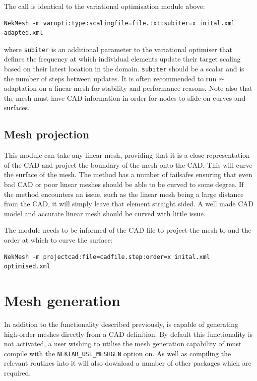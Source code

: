 The call is identical to the variational optimisation module above:
\begin{lstlisting}[style=BashInputStyle]
  NekMesh -m varopti:type:scalingfile=file.txt:subiter=x inital.xml adapted.xml
\end{lstlisting}
where \texttt{subiter} is an additional parameter to the variational
optimiser that defines the frequency at which individual elements
update their target scaling based on their latest location in the domain.
\texttt{subiter} should be a scalar and is the number of steps between updates.
It is often recommended to run \emph{r}-adaptation on a linear mesh for
stability and performance reasons. Note also that the mesh must have
CAD information in order for nodes to slide on curves and surfaces.

\subsection{Mesh projection}
This module can take any linear mesh, providing that it is a close
representation of the CAD and project the boundary of the mesh onto the CAD.
This will curve the surface of the mesh. The method has a number of failsafes
ensuring that even bad CAD or poor linear meshes should be able to be curved to
some degree. If the method encounters an issue, such as the linear mesh being a
large distance from the CAD, it will simply leave that element straight sided. A
well made CAD model and accurate linear mesh should be curved with little issue.

The module needs to be informed of the CAD file to project the mesh to and the
order at which to curve the surface:
\begin{lstlisting}[style=BashInputStyle]
  NekMesh -m projectcad:file=cadfile.step:order=x inital.xml optimised.xml
\end{lstlisting}


\section{Mesh generation}

In addition to the functionality described previously, \nm is capable of
generating high-order meshes directly from a CAD definition. By default this
functionality is not activated, a user wishing to utilise the mesh generation
capability of \nm must compile \nekpp with the \texttt{NEKTAR\_USE\_MESHGEN}
option on. As well as compiling the relevant routines into \nm it will also
download a number of other packages which are required.

